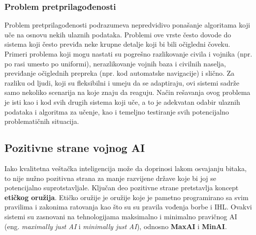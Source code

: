 \documentclass[a4paper]{article}
\begin{document}
\subsubsection{Problem pretprilagođenosti}
\label{subsubsec: Problem pretprilagođenosti}
Problem pretprilagođenosti podrazumeva nepredvidivo ponašanje algoritama koji uče na osnovu nekih ulaznih podataka. Problemi ove vrste često dovode do sistema koji često previđa neke krupne detalje koji bi bili očigledni čoveku. Primeri problema koji mogu nastati su pogrešno razlikovanje civila i vojnika (npr. po rasi umesto po uniformi), nerazlikovanje vojnih baza i civilnih naselja, previđanje očiglednih prepreka (npr. kod automatske navigacije) i slično.
\newline
\newline
Za razliku od ljudi, koji su fleksibilni i umeju da se adaptiraju, ovi sistemi sadrže samo nekoliko scenarija na koje znaju da reaguju. Način rešavanja ovog problema je isti kao i kod svih drugih sistema koji uče, a to je adekvatan odabir ulaznih podataka i algoritma za učenje, kao i temeljno testiranje svih potencijalno problematičnih situacija.
\subsection{Pozitivne strane vojnog AI}
\label{subsec: Pozitivne strane vojnog AI}
Iako kvalitetna veštačka inteligencija može da doprinosi lakom osvajanju bitaka, to nije nužno pozitivna strana za manje razvijene države koje bi joj se potencijalno suprotstavljale. Ključan deo pozitivne strane pretstavlja koncept \textbf{etičkog oružija}. Etičko oružije je oružije koje je pametno programirano sa svim pravilima i zakonima ratovanja kao što su su pravila vođenja borbe i IHL. Ovakvi sistemi su zasnovani na tehnologijama maksimalno i minimalno pravičnog AI (eng. \textit{maximally just AI} i \textit{minimally just AI}), odnosno \textbf{MaxAI} i \textbf{MinAI}.
\end{document}
